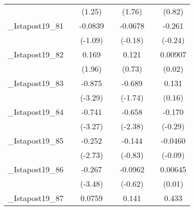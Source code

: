 {\begin{tabular}{l*{6}{c}}
            &                     &      (1.25)         &                     &      (1.76)         &                     &      (0.82)         \\
[1em]
\_Istapost19\_81&                     &     -0.0839         &                     &     -0.0678         &                     &      -0.261         \\
            &                     &     (-1.09)         &                     &     (-0.18)         &                     &     (-0.24)         \\
[1em]
\_Istapost19\_82&                     &       0.169         &                     &       0.121         &                     &     0.00907         \\
            &                     &      (1.96)         &                     &      (0.73)         &                     &      (0.02)         \\
[1em]
\_Istapost19\_83&                     &      -0.875\sym{**} &                     &      -0.689         &                     &       0.131         \\
            &                     &     (-3.29)         &                     &     (-1.74)         &                     &      (0.16)         \\
[1em]
\_Istapost19\_84&                     &      -0.741\sym{**} &                     &      -0.658\sym{*}  &                     &      -0.170         \\
            &                     &     (-3.27)         &                     &     (-2.38)         &                     &     (-0.29)         \\
[1em]
\_Istapost19\_85&                     &      -0.252\sym{*}  &                     &      -0.144         &                     &     -0.0460         \\
            &                     &     (-2.73)         &                     &     (-0.83)         &                     &     (-0.09)         \\
[1em]
\_Istapost19\_86&                     &      -0.267\sym{**} &                     &     -0.0962         &                     &     0.00645         \\
            &                     &     (-3.48)         &                     &     (-0.62)         &                     &      (0.01)         \\
[1em]
\_Istapost19\_87&                     &      0.0759         &                     &       0.141         &                     &       0.433         \\

\end{tabular}}
